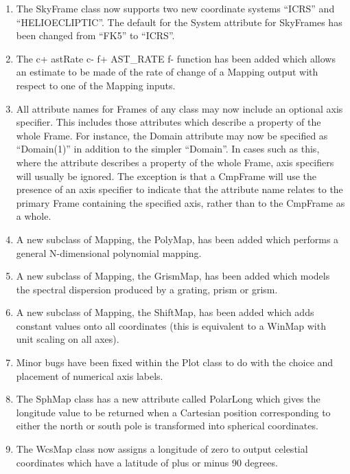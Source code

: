 \documentclass[twoside,11pt]{article}
\begin{document}
\begin{enumerate}
\item The SkyFrame class now supports two new coordinate systems ``ICRS''
and ``HELIOECLIPTIC''. The default for the System attribute for SkyFrames
has been changed from ``FK5'' to ``ICRS''.

\item The
c+
astRate
c-
f+
AST\_RATE
f-
function has been added which allows an estimate to be made of the rate of
change of a Mapping output with respect to one of the Mapping inputs.

\item All attribute names for Frames of any class may now include an optional
axis specifier. This includes those attributes which describe a property
of the whole Frame. For instance, the Domain attribute may now be
specified as ``Domain(1)'' in addition to the simpler ``Domain''. In cases
such as this, where the attribute describes a property of the whole
Frame, axis specifiers will usually be ignored. The exception is that a
CmpFrame will use the presence of an axis specifier to indicate that the
attribute name relates to the primary Frame containing the specified
axis, rather than to the CmpFrame as a whole.

\item A new subclass of Mapping, the PolyMap, has been added which
performs a general N-dimensional polynomial mapping.

\item A new subclass of Mapping, the GrismMap, has been added which
models the spectral dispersion produced by a grating, prism or grism.

\item A new subclass of Mapping, the ShiftMap, has been added which adds
constant values onto all coordinates (this is equivalent to a WinMap
with unit scaling on all axes).

\item Minor bugs have been fixed within the Plot class to do with the choice
and placement of numerical axis labels.

\item The SphMap class has a new attribute called PolarLong which gives the
longitude value to be returned when a Cartesian position corresponding to
either the north or south pole is transformed into spherical coordinates.

\item The WcsMap class now assigns a longitude of zero to output
celestial coordinates which have a latitude of plus or minus 90 degrees.


\end{enumerate}
\end{document}
